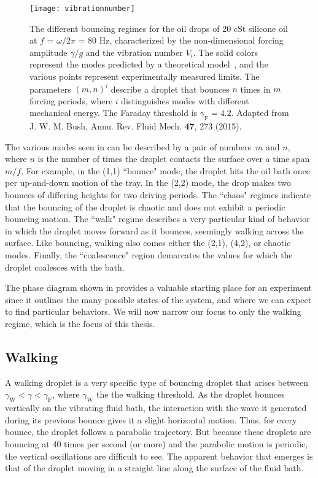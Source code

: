 	    \begin{figure}[h]
	       \centering
	    \texttt{[image: vibrationnumber]}
	     \caption{The different bouncing regimes for the oil drops of 20 cSt silicone oil at $f$ = $\omega / 2\pi$ = 80 Hz, characterized by the non-dimensional forcing amplitude $\gamma/g$ and the vibration number $V_i$. The solid colors represent the  modes predicted by a theoretical model~, and the various points represent experimentally measured limits. The parameters $(m,n)^{i}$ describe a droplet that bounces $n$ times in $m$ forcing periods, where $i$ distinguishes modes with different mechanical energy. The Faraday threshold is $\gamma_\mathrm{F} = 4.2$. Adapted from J. W. M. Bush, Annu. Rev. Fluid Mech. \textbf{47}, 273 (2015).}
	 \label{regime}
	\end{figure}

The various modes seen in  can be described by a pair of numbers~$m$ and $n$, where $n$ is the number of times the droplet contacts the surface over a time span $m/f$. For example, in the (1,1) ``bounce" mode, the droplet hits the oil bath once per up-and-down motion of the tray. In the (2,2) mode, the drop makes two bounces of differing heights for two driving periods. The ``chaos" regimes indicate that the bouncing of the droplet is chaotic and does not exhibit a periodic bouncing motion. The ``walk" regime describes a very particular kind of behavior in which the droplet moves forward as it bounces, seemingly walking across the surface. Like bouncing, walking also comes either the (2,1), (4,2), or chaotic modes. Finally, the ``coalescence" region demarcates the values for which the droplet coalesces with the bath.

The phase diagram shown in  provides a valuable starting place for an experiment since it outlines the many possible states of the system, and where we can expect to find particular behaviors. We will now narrow our focus to only the walking regime, which is the focus of this thesis.

	        \subsection{Walking}
	        \label{sect:walking}
A walking droplet is a very specific type of bouncing droplet that arises between $\gamma_\mathrm{W}<\gamma<\gamma_\mathrm{F}$, where $\gamma_\mathrm{W}$ the the walking threshold. As the droplet bounces vertically on the vibrating fluid bath, the interaction with the wave it generated during its previous bounce gives it a slight horizontal motion. Thus, for every bounce, the droplet follows a parabolic trajectory. But because these droplets are bouncing at 40 times per second (or more) and the parabolic motion is periodic, the vertical oscillations are difficult to see. The apparent behavior that emerges is that of the droplet moving in a straight line along the surface of the fluid bath.             

